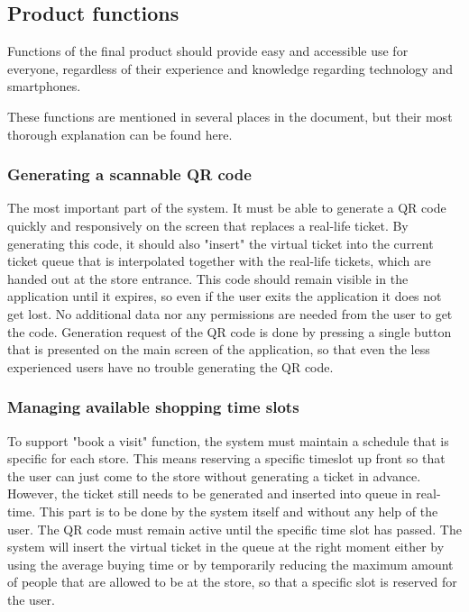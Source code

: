 \newpage

\subsection{Product functions}
\hspace{\parindent}Functions of the final product should provide easy and accessible use for everyone, regardless of their experience and knowledge regarding technology and smartphones. 

These functions are mentioned in several places in the document, but their most thorough explanation can be found here.

\subsubsection{Generating a scannable QR code}

\hspace{\parindent}The most important part of the system. It must be able to generate a QR code quickly and responsively on the screen that replaces a real-life ticket. By generating this code, it should also "insert" the virtual ticket into the current ticket queue that is interpolated together with the real-life tickets, which are handed out at the store entrance. This code should remain visible in the application until it expires, so even if the user exits the application it does not get lost. No additional data nor any permissions are needed from the user to get the code. Generation request of the QR code is done by pressing a single button that is presented on the main screen of the application, so that even the less experienced users have no trouble generating the QR code. 
\subsubsection{Managing available shopping time slots}

\hspace{\parindent}
To support "book a visit" function, the system must maintain a schedule that is specific for each store. This means reserving a specific timeslot up front so that the user can just come to the store without generating a ticket in advance. However, the ticket still needs to be generated and inserted into queue in real-time. This part is to be done by the system itself and without any help of the user. The QR code must remain active until the specific time slot has passed. The system will insert the virtual ticket in the queue at the right moment either by using the average buying time or by  temporarily reducing the maximum amount of people that are allowed to be at the store, so that a specific slot is reserved for the user.

